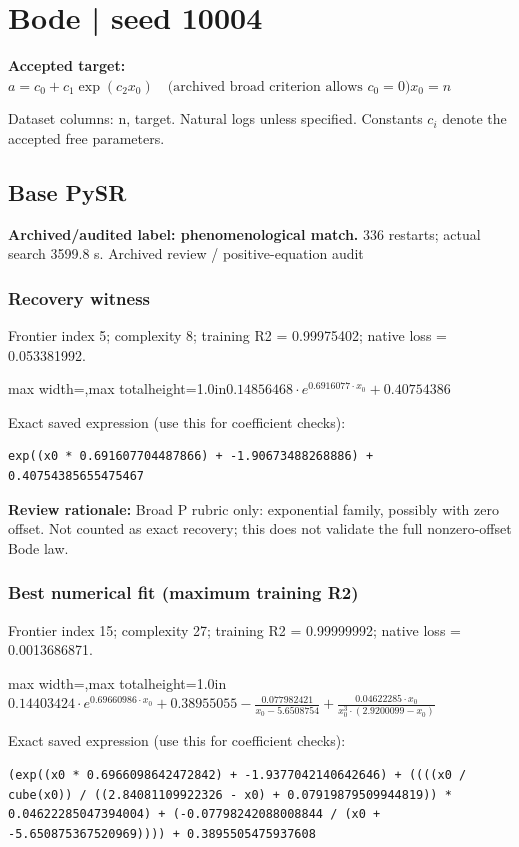 \documentclass[10pt,letterpaper,landscape]{article}
\begin{document}
\section*{Bode | seed 10004}
\textbf{Accepted target:} $\displaystyle a=c_0+c_1\exp(c_2x_0)\quad\text{(archived broad criterion allows }c_0=0\text{)}$\hfill $x_0=n$\par
{\small Dataset columns: n, target. Natural logs unless specified. Constants $c_i$ denote the accepted free parameters.}\par\medskip
\begin{minipage}[t]{0.485\textwidth}
\subsection*{Base PySR}
\textbf{Archived/audited label: phenomenological match.} 336 restarts; actual search 3599.8 s.
{\small Archived review / positive-equation audit}
\subsubsection*{Recovery witness}
Frontier index 5; complexity 8; training R2 = 0.99975402; native loss = 0.053381992.
\begin{center}\begin{adjustbox}{max width=\linewidth,max totalheight=1.0in}$\displaystyle 0.14856468 \cdot e^{0.6916077 \cdot x_{0}} + 0.40754386$\end{adjustbox}\end{center}
{\scriptsize Exact saved expression (use this for coefficient checks):}
\begin{lstlisting}
exp((x0 * 0.691607704487866) + -1.90673488268886) + 0.40754385655475467
\end{lstlisting}
{\small\textbf{Review rationale:} Broad P rubric only: exponential family, possibly with zero offset. Not counted as exact recovery; this does not validate the full nonzero-offset Bode law.}
\subsubsection*{Best numerical fit (maximum training R2)}
Frontier index 15; complexity 27; training R2 = 0.99999992; native loss = 0.0013686871.
\begin{center}\begin{adjustbox}{max width=\linewidth,max totalheight=1.0in}$\displaystyle 0.14403424 \cdot e^{0.69660986 \cdot x_{0}} + 0.38955055 - \frac{0.077982421}{x_{0} - 5.6508754} + \frac{0.04622285 \cdot x_{0}}{x_{0}^{3} \cdot \left(2.9200099 - x_{0}\right)}$\end{adjustbox}\end{center}
{\scriptsize Exact saved expression (use this for coefficient checks):}
\begin{lstlisting}
(exp((x0 * 0.6966098642472842) + -1.9377042140642646) + ((((x0 / cube(x0)) / ((2.84081109922326 - x0) + 0.07919879509944819)) * 0.04622285047394004) + (-0.07798242088008844 / (x0 + -5.650875367520969)))) + 0.3895505475937608
\end{lstlisting}
\end{minipage}\hfill
\end{document}

